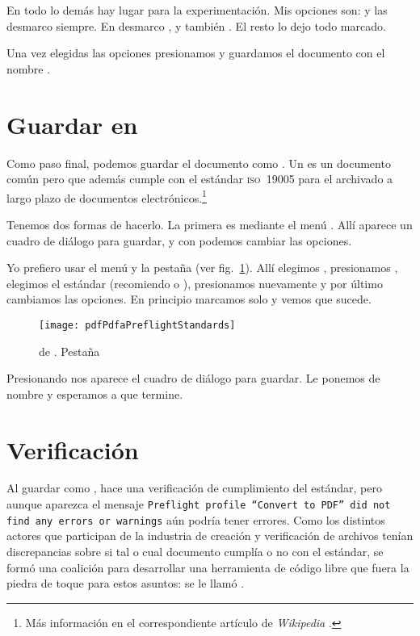 \documentclass[%
	a5paper,
	10pt,
	twoside,
	openright,
	final,
]{memoir}
\begin{document}
	En todo lo demás hay lugar para la experimentación. Mis opciones son:  y  las desmarco siempre. En  desmarco ,  y también . El resto lo dejo todo marcado.

	Una vez elegidas las opciones presionamos  y guardamos el documento con el nombre .

	\section{Guardar en \texorpdfstring{\pdfa{}}{PDF/A}} Como paso final, podemos guardar el documento como \pdfa. Un \pdfa es un documento \pdf común pero que además cumple con el estándar \textsc{iso~19005} para el archivado a largo plazo de documentos electrónicos.\footnote{Más información en el correspondiente artículo de \emph{Wikipedia} \cite{WikipediaPDFA}.}

	Tenemos dos formas de hacerlo. La primera es mediante el menú . Allí aparece un cuadro de diálogo para guardar, y con  podemos cambiar las opciones.

	Yo prefiero usar el menú  y la pestaña  (ver fig.~\ref{fig:pdfPdfaPreflightStandards}). Allí elegimos , presionamos , elegimos el estándar (recomiendo  o ), presionamos  nuevamente y por último cambiamos las opciones. En principio marcamos solo  y vemos que sucede.

	\begin{figure}
		\texttt{[image: pdfPdfaPreflightStandards]}
		\caption[ de \acrobat]{ de \acrobat. Pestaña \label{fig:pdfPdfaPreflightStandards}}
	\end{figure}

	Presionando  nos aparece el cuadro de diálogo para guardar. Le ponemos de nombre  y esperamos a que termine.

	\section{Verificación} Al guardar como \pdfa, \acrobat hace una verificación de cumplimiento del estándar, pero aunque aparezca el mensaje \texttt{Preflight profile ``Convert to PDF'' did not find any errors or warnings} aún podría tener errores. Como los distintos actores que participan de la industria de creación y verificación de archivos \pdfa tenían discrepancias sobre si tal o cual documento cumplía o no con el estándar, se formó una coalición para desarrollar una herramienta de código libre que fuera la piedra de toque para estos asuntos: se le llamó \veraPDF.
\end{document}

